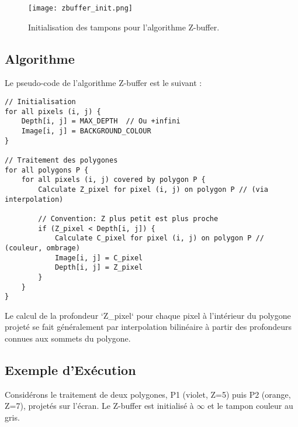 \documentclass{article}
\begin{document}
\begin{figure}[H]
\centering
\texttt{[image: zbuffer\_init.png]}
\caption{Initialisation des tampons pour l'algorithme Z-buffer.}
\label{fig:zbuffer_init}
\end{figure}

\subsection{Algorithme}

Le pseudo-code de l'algorithme Z-buffer est le suivant :

\begin{lstlisting}[language={}, breaklines=true, basicstyle=\small\ttfamily]
// Initialisation
for all pixels (i, j) {
    Depth[i, j] = MAX_DEPTH  // Ou +infini
    Image[i, j] = BACKGROUND_COLOUR
}

// Traitement des polygones
for all polygons P {
    for all pixels (i, j) covered by polygon P {
        Calculate Z_pixel for pixel (i, j) on polygon P // (via interpolation)

        // Convention: Z plus petit est plus proche
        if (Z_pixel < Depth[i, j]) {
            Calculate C_pixel for pixel (i, j) on polygon P // (couleur, ombrage)
            Image[i, j] = C_pixel
            Depth[i, j] = Z_pixel
        }
    }
}
\end{lstlisting}

Le calcul de la profondeur `Z_pixel` pour chaque pixel à l'intérieur du polygone projeté se fait généralement par interpolation bilinéaire à partir des profondeurs connues aux sommets du polygone.

\subsection{Exemple d'Exécution}

Considérons le traitement de deux polygones, P1 (violet, Z=5) puis P2 (orange, Z=7), projetés sur l'écran. Le Z-buffer est initialisé à $\infty$ et le tampon couleur au gris.
\end{document}

